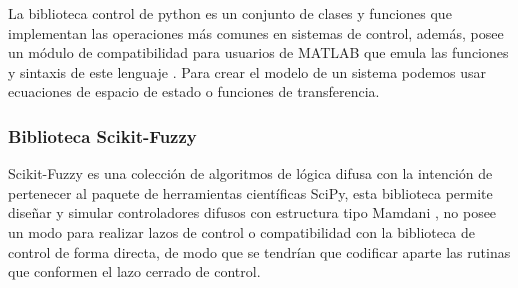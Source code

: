             La biblioteca control de python es un conjunto de clases y funciones que implementan las operaciones más comunes en sistemas de control, además, posee un módulo de compatibilidad para usuarios de MATLAB que emula las funciones y sintaxis de este lenguaje \Parencite{pythoncontrol}. Para crear el modelo de un sistema podemos usar ecuaciones de espacio de estado o funciones de transferencia.

        \subsubsection{Biblioteca Scikit-Fuzzy}
            
            Scikit-Fuzzy es una colección de algoritmos de lógica difusa con la intención de pertenecer al paquete de herramientas científicas SciPy, esta biblioteca permite diseñar y simular controladores difusos con estructura tipo Mamdani \Parencite{warner2016fuzzy}, no posee un modo para realizar lazos de control o compatibilidad con la biblioteca de control de forma directa, de modo que se tendrían que codificar aparte las rutinas que conformen el lazo cerrado de control.